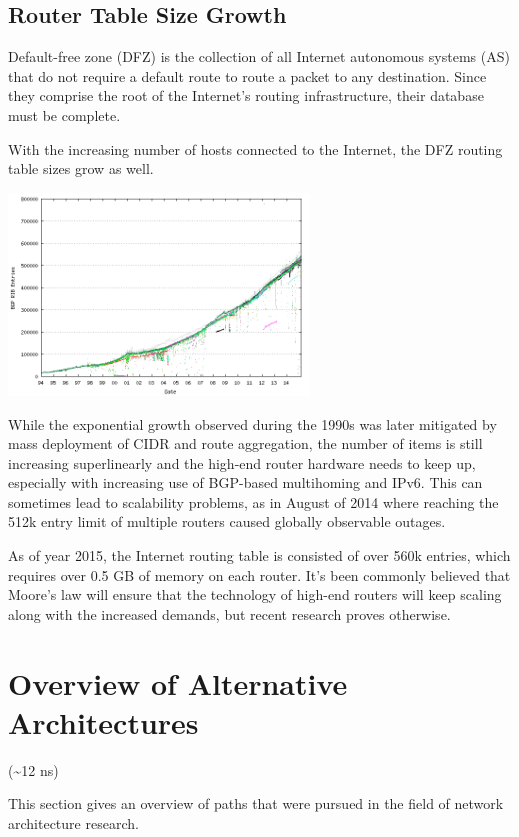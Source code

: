     \section{Router Table Size Growth}
        Default-free zone (DFZ) is the collection of all Internet autonomous systems (AS) that do not require a default route to route a packet to any destination. Since they comprise the root of the Internet's routing infrastructure, their database must be complete.

        With the increasing number of hosts connected to the Internet, the DFZ routing table sizes grow as well.

        \begin{center}\includegraphics[width=0.6\textwidth]{media/bgp-active.png}\end{center}

        While the exponential growth observed during the 1990s was later mitigated by mass deployment of CIDR and route aggregation, the number of items is still increasing superlinearly and the high-end router hardware needs to keep up, especially with increasing use of BGP-based multihoming and IPv6. This can sometimes lead to scalability problems, as in August of 2014 where reaching the 512k entry limit of multiple routers caused globally observable outages.

        As of year 2015, the Internet routing table is consisted of over 560k entries, which requires over 0.5 GB of memory on each router. It's been commonly believed that Moore's law will ensure that the technology of high-end routers will keep scaling along with the increased demands, but recent research proves otherwise.

\chapter{Overview of Alternative Architectures}
    (\textasciitilde12 ns)

    This section gives an overview of paths that were pursued in the field of network architecture research.


